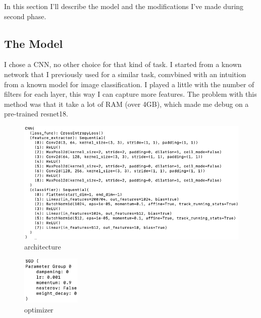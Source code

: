 In this section I'll describe the model and the modifications I've made during second phase.
\subsection{The Model}
I chose a CNN, no other choice for that kind of task.
I started from a known network that I previously used for a similar task, comvbined with an intuition from a known model
for image classification.
I played a little with the number of filters for each layer, this way I can capture more features.
The problem with this method was that it take a lot of RAM (over 4GB), which made me debug on a pre-trained resnet18.
\begin{figure}[H]
    \centering
     \includegraphics[scale=0.5]{images/architecture}
    \caption{architecture}
    \label{fig:architecture}
\end{figure}

\begin{figure}[H]
    \centering
    \includegraphics[width=0.25\textwidth]{images/optimizer}
    \caption{optimizer}
    \label{fig:optimizer}
\end{figure}
